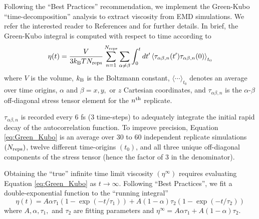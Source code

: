 \documentclass[preprint,review,12pt]{elsarticle}
\begin{document}
	Following the ``Best Practices'' recommendation, we implement the Green-Kubo ``time-decomposition'' analysis to extract viscosity from EMD simulations. We refer the interested reader to References  and  for further details. In brief, the Green-Kubo integral is computed with respect to time according to
	\begin{equation} \label{eq:Green_Kubo}
	\eta(t) = \frac{V}{3 k_{\rm B} T N_{\rm reps}} \sum_{n=1}^{N_{\rm reps}} \sum_{\alpha \ne \beta} \int_{0}^{t}dt'\left\langle \tau_{\alpha\beta,n}(t') \tau_{\alpha\beta,n}(0)\right\rangle_{t_0}
	\end{equation} 
	where $V$ is the volume, $k_{\rm B}$ is the Boltzmann constant, $\langle \cdots \rangle_{t_0}$ denotes an average over time origins, $\alpha$ and $\beta = x, y, $ or $z$ Cartesian coordinates, and $\tau_{\alpha\beta,n}$ is the $\alpha$-$\beta$ off-diagonal stress tensor element for the $n^{\rm th}$ replicate. 
	
	$\tau_{\alpha\beta,n}$ is recorded every 6 fs (3 time-steps) to adequately integrate the initial rapid decay of the autocorrelation function. To improve precision, Equation \ref{eq:Green_Kubo} is an average over 30 to 60 independent replicate simulations $(N_{\rm reps})$, twelve different time-origins $(t_0)$, and all three unique off-diagonal components of the stress tensor (hence the factor of 3 in the denominator).
	
	Obtaining the ``true'' infinite time limit viscosity $(\eta^{\infty})$ requires evaluating Equation \ref{eq:Green_Kubo} as $t \rightarrow \infty$. Following ``Best Practices'', we fit a double-exponential function to the ``running integral''
	\begin{equation} \label{eq: Double exponential}
	\eta(t) = A \alpha \tau_1 \left(1-\exp{(-t/\tau_1)}\right) + A (1-\alpha) \tau_2 \left(1-\exp{(-t/\tau_2)}\right)
	\end{equation}
	where $A, \alpha, \tau_1, $ and $\tau_2$ are fitting parameters and $\eta^\infty = A \alpha \tau_1 + A (1-\alpha) \tau_2$.
	
\end{document}
